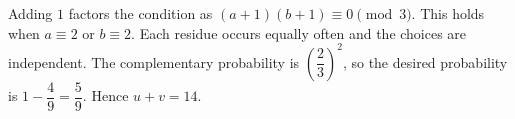 Adding $1$ factors the condition as $(a+1)(b+1)\equiv 0\pmod 3$. This holds when $a\equiv 2$ or $b\equiv 2$. Each residue occurs equally often and the choices are independent. The complementary probability is $(\dfrac{2}{3})^2$, so the desired probability is $1-\dfrac{4}{9}=\dfrac{5}{9}$. Hence $\boxed{u+v=14}$.

